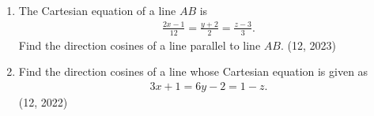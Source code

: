 \begin{enumerate}[label=\thesubsection.\arabic*,ref=\thesubsection.\theenumi]
    \item The Cartesian equation of a line $AB$ is
    \begin{align}
        \frac{2x - 1}{12} = \frac{y + 2}{2} = \frac{z - 3}{3}.
    \end{align}
Find the direction cosines of a line parallel to line $AB$.
    \hfill (12, 2023)
    \item Find the direction cosines of a line whose Cartesian equation is given as
    \begin{align}
        3x + 1 = 6y - 2 = 1 - z.
    \end{align}
    \hfill (12, 2022)
\end{enumerate}
